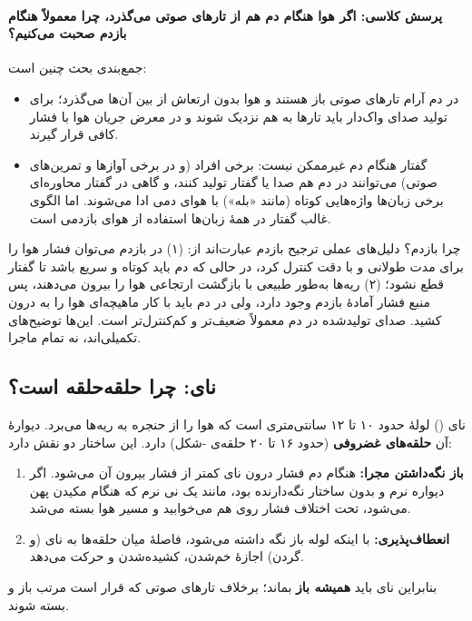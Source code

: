 \paragraph{پرسش کلاسی: اگر هوا هنگام دم هم از تارهای صوتی می‌گذرد، چرا معمولاً هنگام بازدم صحبت می‌کنیم؟}
جمع‌بندی بحث چنین است:
\begin{itemize}
  \item در دم آرام تارهای صوتی باز هستند و هوا بدون ارتعاش از بین آن‌ها می‌گذرد؛ برای تولید صدای واک‌دار باید تارها به هم نزدیک شوند و در معرض جریان هوا با فشار کافی قرار گیرند.
  \item گفتار هنگام دم غیرممکن نیست: برخی افراد (و در برخی آوازها و تمرین‌های صوتی) می‌توانند در دم هم صدا یا گفتار تولید کنند، و گاهی در گفتار محاوره‌ای برخی زبان‌ها واژه‌هایی کوتاه (مانند «بله») با هوای دمی ادا می‌شوند. اما الگوی غالب گفتار در همهٔ زبان‌ها استفاده از هوای بازدمی است.
\end{itemize}

\begin{addedbox}{چرا بازدم؟}
دلیل‌های عملی ترجیح بازدم عبارت‌اند از: (۱) در بازدم می‌توان فشار هوا را برای مدت طولانی و با دقت کنترل کرد، در حالی که دم باید کوتاه و سریع باشد تا گفتار قطع نشود؛ (۲) ریه‌ها به‌طور طبیعی با بازگشت ارتجاعی هوا را بیرون می‌دهند، پس منبع فشار آمادهٔ بازدم وجود دارد، ولی در دم باید با کار ماهیچه‌ای هوا را به درون کشید. صدای تولیدشده در دم معمولاً ضعیف‌تر و کم‌کنترل‌تر است. این‌ها توضیح‌های تکمیلی‌اند، نه تمام ماجرا.
\end{addedbox}

\subsection{نای: چرا حلقه‌حلقه است؟}
نای () لولهٔ حدود ۱۰ تا ۱۲ سانتی‌متری است که هوا را از حنجره به ریه‌ها می‌برد. دیوارهٔ آن \textbf{حلقه‌های غضروفی} (حدود ۱۶ تا ۲۰ حلقه‌ی -شکل) دارد. این ساختار دو نقش دارد:
\begin{enumerate}
  \item \textbf{باز نگه‌داشتن مجرا:} هنگام دم فشار درون نای کمتر از فشار بیرون آن می‌شود. اگر دیواره نرم و بدون ساختار نگه‌دارنده بود، مانند یک نی نرم که هنگام مکیدن پهن می‌شود، تحت اختلاف فشار روی هم می‌خوابید و مسیر هوا بسته می‌شد.
  \item \textbf{انعطاف‌پذیری:} با اینکه لوله باز نگه داشته می‌شود، فاصلهٔ میان حلقه‌ها به نای (و گردن) اجازهٔ خم‌شدن، کشیده‌شدن و حرکت می‌دهد.
\end{enumerate}
بنابراین نای باید \textbf{همیشه باز} بماند؛ برخلاف تارهای صوتی که قرار است مرتب باز و بسته شوند.

